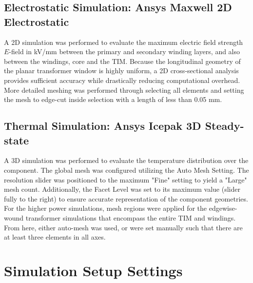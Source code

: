 \subsection*{Electrostatic Simulation: Ansys Maxwell 2D Electrostatic}

A 2D simulation was performed to evaluate the maximum electric field strength $E$-field in kV/mm between the primary and secondary winding layers, and also between the windings, core and the TIM. Because the longitudinal geometry of the planar transformer window is highly uniform, a 2D cross-sectional analysis provides sufficient accuracy while drastically reducing computational overhead. More detailed meshing was performed through selecting all elements and setting the mesh to edge-cut inside selection with a length of less than 0.05 mm. 

\subsection*{Thermal Simulation: Ansys Icepak 3D Steady-state}
A 3D simulation was performed to evaluate the temperature distribution over the component. The global mesh was configured utilizing the Auto Mesh Setting. The resolution slider was positioned to the maximum "Fine" setting to yield a "Large" mesh count. Additionally, the Facet Level was set to its maximum value (slider fully to the right) to ensure accurate representation of the component geometries. For the higher power simulations, mesh regions were applied for the edgewise-wound transformer simulations that encompass the entire TIM and windings. From here, either auto-mesh was used, or were set manually such that there are at least three elements in all axes.

\section*{Simulation Setup Settings}

